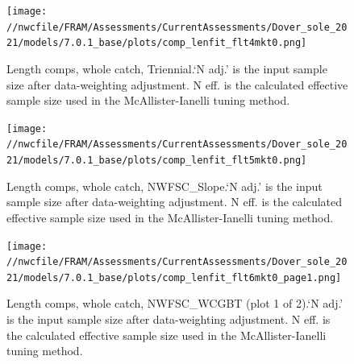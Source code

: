 \documentclass[11pt,
  english,
  a4paper,
]{article}
\begin{document}
\tagmcend\tagstructend


\begin{figure}
\centering
\texttt{[image: //nwcfile/FRAM/Assessments/CurrentAssessments/Dover\_sole\_2021/models/7.0.1\_base/plots/comp\_lenfit\_flt4mkt0.png]}
\caption{Length comps, whole catch, Triennial.`N adj.' is the input sample size after data-weighting adjustment. N eff. is the calculated effective sample size used in the McAllister-Ianelli tuning method.\label{fig:comp_lenfit_flt4mkt0}}
\end{figure}

\tagmcend\tagstructend


\begin{figure}
\centering
\texttt{[image: //nwcfile/FRAM/Assessments/CurrentAssessments/Dover\_sole\_2021/models/7.0.1\_base/plots/comp\_lenfit\_flt5mkt0.png]}
\caption{Length comps, whole catch, NWFSC\_Slope.`N adj.' is the input sample size after data-weighting adjustment. N eff. is the calculated effective sample size used in the McAllister-Ianelli tuning method.\label{fig:comp_lenfit_flt5mkt0}}
\end{figure}

\tagmcend\tagstructend


\begin{figure}
\centering
\texttt{[image: //nwcfile/FRAM/Assessments/CurrentAssessments/Dover\_sole\_2021/models/7.0.1\_base/plots/comp\_lenfit\_flt6mkt0\_page1.png]}
\caption{Length comps, whole catch, NWFSC\_WCGBT (plot 1 of 2).`N adj.' is the input sample size after data-weighting adjustment. N eff. is the calculated effective sample size used in the McAllister-Ianelli tuning method.\label{fig:comp_lenfit_flt6mkt0_page1}}
\end{figure}
\end{document}
